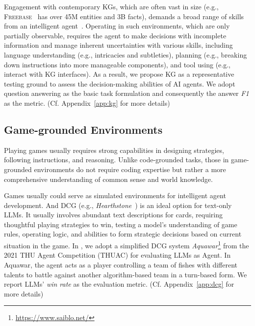 Engagement with contemporary KGs, which are often vast in size (e.g., \textsc{Freebase}~\citep{freebase} has over 45M entities and 3B facts), demands a broad range of skills from an intelligent agent~\citep{gu-etal-2023-dont}.
Operating in such environments, which are only partially observable, requires the agent to make decisions with incomplete information and manage inherent uncertainties with various skills, including language understanding (e.g., intricacies and subtleties), planning (e.g., breaking down instructions into more manageable components), 
and tool using (e.g., interact with KG interfaces). 
As a result, we propose KG as a representative testing ground to assess the decision-making abilities of AI agents.
We adopt question answering as the basic task formulation and consequently the answer \textit{F1} as the metric. (Cf. Appendix~\ref{app:kg} for more details)


\subsection{Game-grounded Environments}
Playing games usually requires strong capabilities in designing strategies, following instructions, and reasoning.
Unlike code-grounded tasks, those in game-grounded environments do not require coding expertise but rather a more comprehensive understanding of common sense and world knowledge.

Games usually could serve as simulated environments for intelligent agent development.
And DCG (e.g., \textit{Hearthstone}~\citep{hoover2020many}) is an ideal option for text-only LLMs.
It usually involves abundant text descriptions for cards, requiring thoughtful playing strategies to win, testing a model's understanding of game rules, operating logic, and abilities to form strategic decisions based on current situation in the game.
In \model, we adopt a simplified DCG system \textit{Aquawar}\footnote{\url{https://www.saiblo.net/}} from the 2021 THU Agent Competition (THUAC) for evaluating LLMs as Agent.
In Aquawar, the agent acts as a player controlling a team of fishes with different talents to battle against another algorithm-based team in a turn-based form.
We report LLMs' \textit{win rate} as the evaluation metric. (Cf. Appendix~\ref{app:dcg} for more details)


